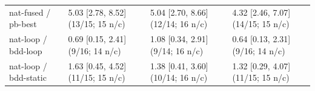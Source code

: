 \begin{table}[t]
\begin{tabular}{llll}
\textsf{nat-fused} / \textsf{pb-best} & 5.03 [2.78, 8.52]\,{\scriptsize(13/15; 15 n/c)} & 5.04 [2.70, 8.66]\,{\scriptsize(12/14; 16 n/c)} & 4.32 [2.46, 7.07]\,{\scriptsize(14/15; 15 n/c)} \\
\textsf{nat-loop} / \textsf{bdd-loop} & 0.69 [0.15, 2.41]\,{\scriptsize(9/16; 14 n/c)} & 1.08 [0.34, 2.91]\,{\scriptsize(9/14; 16 n/c)} & 0.64 [0.13, 2.31]\,{\scriptsize(9/16; 14 n/c)} \\
\textsf{nat-loop} / \textsf{bdd-static} & 1.63 [0.45, 4.52]\,{\scriptsize(11/15; 15 n/c)} & 1.38 [0.41, 3.60]\,{\scriptsize(10/14; 16 n/c)} & 1.32 [0.29, 4.07]\,{\scriptsize(11/15; 15 n/c)} \\
\bottomrule
\end{tabular}
\end{table}
